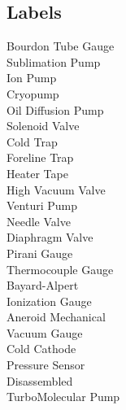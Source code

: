 \documentclass{book}
\begin{document}
{\subsection{Labels}
\begin{centering}
\fontsize{48}{48}\selectfont
Bourdon Tube Gauge\\
\vspace{30 mm}
Sublimation Pump\\
\vspace{30 mm}
Ion Pump\\
\vspace{30 mm}
Cryopump\\
\vspace{30 mm}
Oil Diffusion Pump\\
\vspace{30 mm}
Solenoid Valve\\
\vspace{30 mm}
Cold Trap\\
\vspace{30 mm}
Foreline Trap\\
\vspace{30 mm}
Heater Tape\\
\vspace{30 mm}
High Vacuum Valve\\
\vspace{30 mm}
Venturi Pump\\
\vspace{30 mm}
Needle Valve\\
\vspace{30 mm}
Diaphragm Valve\\
\vspace{30 mm}
Pirani Gauge\\
\vspace{30 mm}
Thermocouple Gauge\\
\vspace{30 mm}
Bayard-Alpert\\
Ionization Gauge\\
\vspace{30 mm}
Aneroid Mechanical\\
Vacuum Gauge\\
\vspace{30 mm}
Cold Cathode\\ 
Pressure Sensor\\
\vspace{30 mm}
Disassembled\\
TurboMolecular Pump\\
\vspace{30 mm}

\end{centering}}
\end{document}
